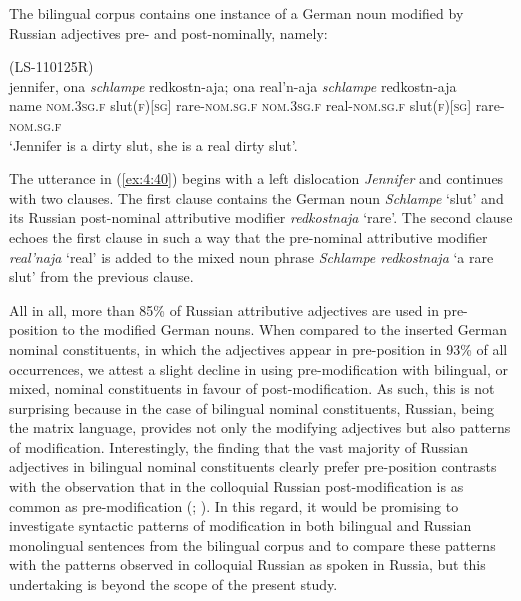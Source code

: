 The bilingual corpus contains one instance of a German noun modified by Russian adjectives pre- and post-nominally, namely:

\ea
\label{ex:4:40}
(LS-110125R)\\
\gll jennifer, ona \textit{schlampe}  redkostn-aja; ona real'n-aja \textit{schlampe}  redkostn-aja\\
	name \textsc{nom.3sg.f} slut(\textsc{f})[\textsc{sg}] rare-\textsc{nom.sg.f} \textsc{nom.3sg.f} real-\textsc{nom.sg.f} slut(\textsc{f})[\textsc{sg}] rare-\textsc{nom.sg.f}\\
\glt `Jennifer is a dirty slut, she is a real dirty slut'.
\z

\noindent The utterance in (\ref{ex:4:40}) begins with a left dislocation \textit{Jennifer} and continues with two clauses. The first clause contains the German noun \textit{Schlampe} `slut' and its Russian post-nominal attributive modifier \textit{redkostnaja} `rare'. The second clause echoes the first clause in such a way that the pre-nominal attributive modifier \textit{real'naja} ‘real’ is added to the mixed noun phrase \textit{Schlampe redkostnaja} `a rare slut' from the previous clause.

All in all, more than 85\% of Russian attributive adjectives are used in pre-position to the modified German nouns. When compared to the inserted German nominal constituents, in which the adjectives appear in pre-position in 93\% of all occurrences, we attest a slight decline in using pre-modification with bilingual, or mixed, nominal constituents in favour of post-modification. As such, this is not surprising because in the case of bilingual nominal constituents, Russian, being the matrix language, provides not only the modifying adjectives but also patterns of modification. Interestingly, the finding that the vast majority of Russian adjectives in bilingual nominal constituents clearly prefer pre-position contrasts with the observation that in the colloquial Russian post-modification is as common as pre-modification (\citealt[207]{lapteva}; \citealt[148-149]{zemskaja}). In this regard, it would be promising to investigate syntactic patterns of modification in both bilingual and Russian monolingual sentences from the bilingual corpus and to compare these patterns with the patterns observed in colloquial Russian as spoken in Russia, but this undertaking is beyond the scope of the present study.

